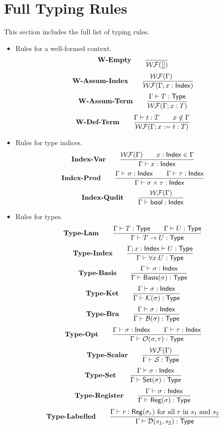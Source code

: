 
\section{Full Typing Rules}

\label{sec: full typing rules}

This section includes the full list of typing rules.

\begin{itemize}
    \item Rules for a well-formed context.
    \[
        \textbf{W-Empty} \qquad
        \frac{}{\mathcal{WF}([])}
    \]
    \[
        \textbf{W-Assum-Index} \qquad
        \frac{\mathcal{WF}(\Gamma) \qquad}{\mathcal{WF}(\Gamma; x : \mathsf{Index})}
    \]
    \[
        \textbf{W-Assum-Term} \qquad
        \frac{\Gamma \vdash T : \mathsf{Type}}{\mathcal{WF}(\Gamma; x:T)}
    \]
    \[
        \textbf{W-Def-Term} \qquad
        \frac{\Gamma \vdash t:T \qquad x \notin \Gamma}{\mathcal{WF}(\Gamma; x:=t:T)}
    \]

    \item Rules for type indices.
    \[
        \textbf{Index-Var} \qquad
        \frac{\mathcal{WF}(\Gamma) \qquad x : \mathsf{Index} \in \Gamma}{\Gamma \vdash x : \mathsf{Index}}
    \]
    \[
        \textbf{Index-Prod} \qquad
        \frac{\Gamma \vdash \sigma : \mathsf{Index} \qquad \Gamma \vdash \tau : \mathsf{Index}}{\Gamma \vdash \sigma \times \tau : \mathsf{Index}}
    \]
    \[
        \textbf{Index-Qudit} \qquad
        \frac{\mathcal{WF}(\Gamma)}{\Gamma \vdash \mathsf{bool} : \mathsf{Index}}
    \]


    \item Rules for types.
    \[
        \textbf{Type-Lam} \qquad
        \frac{\Gamma \vdash T : \mathsf{Type} \qquad \Gamma \vdash U : \mathsf{Type}}{\Gamma \vdash T \to U : \mathsf{Type}}
    \]
    \[
        \textbf{Type-Index} \qquad
        \frac{\Gamma; x : \mathsf{Index} \vdash U : \mathsf{Type}}{\Gamma \vdash \forall x.U : \mathsf{Type}}
    \]
    \[
        \textbf{Type-Basis} \qquad
        \frac{\Gamma \vdash \sigma : \mathsf{Index}}{\Gamma \vdash \mathsf{Basis}(\sigma) : \mathsf{Type}}
    \]
    \[
        \textbf{Type-Ket} \qquad
        \frac{\Gamma \vdash \sigma : \mathsf{Index}}{\Gamma \vdash \mathcal{K}(\sigma) : \mathsf{Type}}
    \]
    \[
        \textbf{Type-Bra} \qquad
        \frac{\Gamma \vdash \sigma : \mathsf{Index}}{\Gamma \vdash \mathcal{B}(\sigma) : \mathsf{Type}}
    \]
    \[
        \textbf{Type-Opt} \qquad
        \frac{\Gamma \vdash \sigma : \mathsf{Index} \qquad \Gamma \vdash \tau : \mathsf{Index}}{\Gamma \vdash \mathcal{O}(\sigma, \tau) : \mathsf{Type}}
    \]
    \[
        \textbf{Type-Scalar} \qquad
        \frac{\mathcal{WF}(\Gamma)}{\Gamma \vdash \mathcal{S} : \mathsf{Type}}
    \]
    \[
        \textbf{Type-Set} \qquad
        \frac{\Gamma \vdash \sigma : \mathsf{Index}}{\Gamma \vdash \mathsf{Set}(\sigma) : \mathsf{Type}}
    \]
    \[
        \textbf{Type-Register} \qquad
        \frac{\Gamma \vdash  \sigma : \mathsf{Index}}{\Gamma \vdash \mathsf{Reg}(\sigma) : \mathsf{Type}}
    \]
    \[
        \textbf{Type-Labelled} \qquad
        \frac{\Gamma \vdash r : \mathsf{Reg}(\sigma_r) \text{ for all $r$ in $s_1$ and $s_2$} }{\Gamma \vdash \mathcal{D}(s_1, s_2) : \textsf{Type}} 
    \]


\end{itemize}
